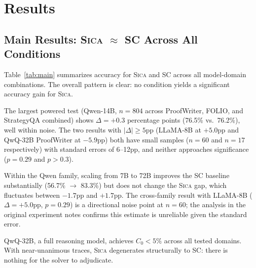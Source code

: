 \documentclass[11pt,a4paper]{article}
\newcommand{\sica}{\textsc{Sica}}
\newcommand{\czero}{C_0}
\begin{document}
\section{Results}

\subsection{Main Results: \sica{} $\approx$ SC Across All Conditions}

Table~\ref{tab:main} summarizes accuracy for \sica{} and SC across all model-domain combinations. The overall pattern is clear: no condition yields a significant accuracy gain for \sica{}.

The largest powered test (Qwen-14B, $n = 804$ across ProofWriter, FOLIO, and StrategyQA combined) shows $\Delta = +0.3$ percentage points (76.5\% vs.\ 76.2\%), well within noise. The two results with $|\Delta| \geq 5$pp (LLaMA-8B at $+5.0$pp and QwQ-32B ProofWriter at $-5.9$pp) both have small samples ($n = 60$ and $n = 17$ respectively) with standard errors of 6--12pp, and neither approaches significance ($p = 0.29$ and $p > 0.3$).

Within the Qwen family, scaling from 7B to 72B improves the SC baseline substantially (56.7\% $\to$ 83.3\%) but does not change the \sica{} gap, which fluctuates between $-1.7$pp and $+1.7$pp. The cross-family result with LLaMA-8B ($\Delta = +5.0$pp, $p = 0.29$) is a directional noise point at $n = 60$; the analysis in the original experiment notes confirms this estimate is unreliable given the standard error.

QwQ-32B, a full reasoning model, achieves $\czero < 5\%$ across all tested domains. With near-unanimous traces, \sica{} degenerates structurally to SC: there is nothing for the solver to adjudicate.
\end{document}
